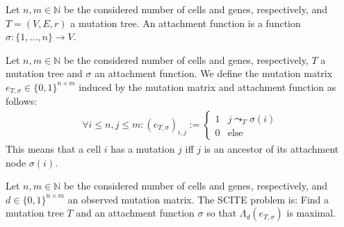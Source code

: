 \begin{definition}
    \label{def:attachment}
    Let $n, m \in \mathbb{N}$ be the considered number of cells and genes, respectively, and $T = (V, E, r)$ a mutation tree. An attachment function is a function $\sigma: \{1, \dots, n\} \rightarrow V$.
\end{definition}

\begin{definition}
    \label{def:induced_mutmatrix}
    Let $n, m \in \mathbb{N}$ be the considered number of cells and genes, respectively, $T$ a mutation tree and $\sigma$ an attachment function. We define the mutation matrix $e_{T, \sigma} \in \{0,1\}^{n \times m}$ induced by the mutation matrix and attachment function as follows:
    \begin{align*}
        \forall i \leq n, j \leq m: (e_{T, \sigma})_{i,j} := \begin{cases}
            1 & j \leadsto_T \sigma(i) \\
            0 & \mathrm{else}
        \end{cases}
    \end{align*}
    This means that a cell $i$ has a mutation $j$ iff $j$ is an ancestor of its attachment node $\sigma(i)$.
\end{definition}

\begin{definition}
    \label{def:scite_problem}
    Let $n, m \in \mathbb{N}$ be the considered number of cells and genes, respectively, and $d \in \{0,1\}^{n \times m}$ an observed mutation matrix. The \ac{SCITE} problem is: Find a mutation tree $T$ and an attachment function $\sigma$ so that $\Lambda_d(e_{T, \sigma})$ is maximal.
\end{definition}


